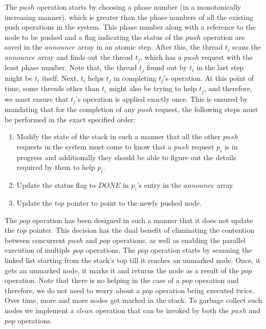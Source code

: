 \documentclass{llncs}
\begin{document}
The $push$ operation starts by choosing a phase number (in a monotonically increasing manner), which is greater than
the phase numbers of all the existing push operations in the system. This phase
number along with a reference to the node to be pushed and a flag indicating
the status of the $push$ operation are saved in the $announce$ array in an
atomic step. After this, the thread $t_i$ scans the $announce$ array and finds
out the thread $t_j$, which has a $push$ request with the least phase
number. Note that, the thread $t_j$ found out by $t_i$ in the last step might
be $t_i$ itself. Next, $t_i$ helps $t_j$ in completing $t_j$'s operation. At
this point of time, some threads other than $t_i$ might also be trying to help
$t_j$, and therefore, we must ensure that $t_j$'s operation is applied exactly
once. This is ensured by mandating that for the completion of any $push$
request, the following steps must be performed in the exact specified order:

\begin{enumerate} 
\item Modify the state of the stack in such a manner
that all the other $push$ requests in the system must come to know that a
$push$ request $p_i$ is in progress and additionally they should be able to figure out
the details required by them to help $p_i$.  
\item Update the status flag to
$DONE$ in $p_i$'s entry in the $announce$ array.  
\item Update the $top$
pointer to point to the newly pushed node.  
\end{enumerate}




The $pop$ operation has been designed in such a manner that it does not update
the $top$ pointer. This decision has the dual benefit of eliminating the
contention between concurrent $push$ and $pop$ operations, as well as enabling the
parallel execution of multiple $pop$ operations. The $pop$ operation starts by
scanning the linked list starting from the stack's top till it reaches an
unmarked node. Once, it gets an unmarked node, it marks it and returns the node
as a result of the $pop$ operation.  Note that there is no helping in the case
of a $pop$ operation and therefore, we do not need to worry about a $pop$
operation being executed twice. Over time, more and more nodes get marked in
the stack. To garbage collect such nodes we implement a $clean$ operation
that can be invoked by both the $push$ and $pop$ operations. 
\end{document}
